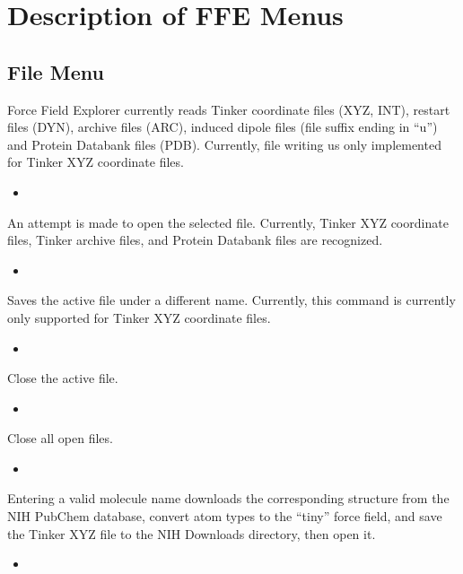 \documentclass[letterpaper,11pt,english]{sphinxmanual}
\begin{document}
\chapter{Description of FFE Menus}
\label{\detokenize{text/menus:description-of-ffe-menus}}\label{\detokenize{text/menus::doc}}

\section{File Menu}
\label{\detokenize{text/menus:file-menu}}
Force Field Explorer currently reads Tinker coordinate files (XYZ, INT), restart files (DYN), archive files (ARC), induced dipole files (file suffix ending in “u”) and Protein Databank files (PDB). Currently, file writing us only implemented for Tinker XYZ coordinate files.
\begin{itemize}
\item {} 

\end{itemize}

An attempt is made to open the selected file. Currently, Tinker XYZ coordinate files, Tinker archive files, and Protein Databank files are recognized.
\begin{itemize}
\item {} 

\end{itemize}

Saves the active file under a different name. Currently, this command is currently only supported for Tinker XYZ coordinate files.
\begin{itemize}
\item {} 

\end{itemize}

Close the active file.
\begin{itemize}
\item {} 

\end{itemize}

Close all open files.
\begin{itemize}
\item {} 

\end{itemize}

Entering a valid molecule name downloads the corresponding structure from the NIH PubChem database, convert atom types to the “tiny” force field, and save the Tinker XYZ file to the NIH Downloads directory, then open it.
\begin{itemize}
\item {} 

\end{itemize}
\end{document}
